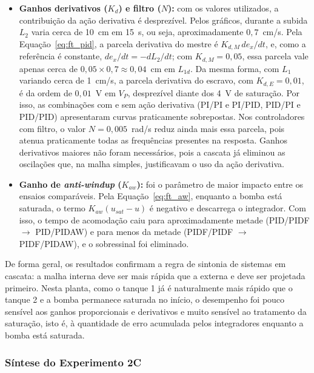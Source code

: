 \documentclass[a4paper,12pt]{article}
\begin{document}
\begin{itemize}
    \item \textbf{Ganhos derivativos ($K_d$) e filtro ($N$):} com os valores utilizados, a contribuição da ação derivativa é desprezível. Pelos gráficos, durante a subida $L_2$ varia cerca de 10~cm em 15~s, ou seja, aproximadamente $0{,}7$~cm/s. Pela Equação~\eqref{eq:ft_pid}, a parcela derivativa do mestre é $K_{d,M}\, de_x/dt$, e, como a referência é constante, $de_x/dt = -dL_2/dt$; com $K_{d,M} = 0{,}05$, essa parcela vale apenas cerca de $0{,}05 \times 0{,}7 \approx 0{,}04$~cm em $L_{1d}$. Da mesma forma, com $L_1$ variando cerca de 1~cm/s, a parcela derivativa do escravo, com $K_{d,E} = 0{,}01$, é da ordem de $0{,}01$~V em $V_P$, desprezível diante dos 4~V de saturação. Por isso, as combinações com e sem ação derivativa (PI/PI e PI/PID, PID/PI e PID/PID) apresentaram curvas praticamente sobrepostas. Nos controladores com filtro, o valor $N = 0{,}005$~rad/s reduz ainda mais essa parcela, pois atenua praticamente todas as frequências presentes na resposta. Ganhos derivativos maiores não foram necessários, pois a cascata já eliminou as oscilações que, na malha simples, justificavam o uso da ação derivativa.

    \item \textbf{Ganho de \textit{anti-windup} ($K_{aw}$):} foi o parâmetro de maior impacto entre os ensaios comparáveis. Pela Equação~\eqref{eq:ft_aw}, enquanto a bomba está saturada, o termo $K_{aw}(u_{sat} - u)$ é negativo e descarrega o integrador. Com isso, o tempo de acomodação caiu para aproximadamente metade (PID/PIDF $\rightarrow$ PID/PIDAW) e para menos da metade (PIDF/PIDF $\rightarrow$ PIDF/PIDAW), e o sobressinal foi eliminado.
\end{itemize}

\begin{justify}
    \hspace{4ex}De forma geral, os resultados confirmam a regra de sintonia de sistemas em cascata: a malha interna deve ser mais rápida que a externa e deve ser projetada primeiro. Nesta planta, como o tanque 1 já é naturalmente mais rápido que o tanque 2 e a bomba permanece saturada no início, o desempenho foi pouco sensível aos ganhos proporcionais e derivativos e muito sensível ao tratamento da saturação, isto é, à quantidade de erro acumulada pelos integradores enquanto a bomba está saturada.
\end{justify}

\subsubsection{Síntese do Experimento 2C}
\end{document}
